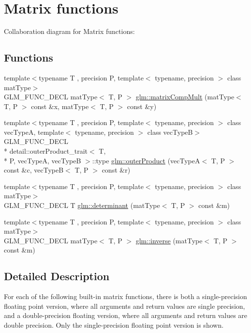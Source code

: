 \hypertarget{group__core__func__matrix}{\section{Matrix functions}
\label{group__core__func__matrix}
}
Collaboration diagram for Matrix functions\-:
\subsection*{Functions}
\begin{DoxyCompactItemize}
\item 
{\footnotesize template$<$typename T , precision P, template$<$ typename, precision $>$ class mat\-Type$>$ }\\G\-L\-M\-\_\-\-F\-U\-N\-C\-\_\-\-D\-E\-C\-L mat\-Type$<$ T, P $>$ \hyperlink{group__core__func__matrix_ga4a54992e4741188ee624b21e3ba91814}{glm\-::matrix\-Comp\-Mult} (mat\-Type$<$ T, P $>$ const \&x, mat\-Type$<$ T, P $>$ const \&y)
\item 
{\footnotesize template$<$typename T , precision P, template$<$ typename, precision $>$ class vec\-Type\-A, template$<$ typename, precision $>$ class vec\-Type\-B$>$ }\\G\-L\-M\-\_\-\-F\-U\-N\-C\-\_\-\-D\-E\-C\-L \\*
detail\-::outer\-Product\-\_\-trait$<$ T, \\*
P, vec\-Type\-A, vec\-Type\-B $>$\-::type \hyperlink{group__core__func__matrix_gae9f513dc8e4f3ceb993669321b6d0f09}{glm\-::outer\-Product} (vec\-Type\-A$<$ T, P $>$ const \&c, vec\-Type\-B$<$ T, P $>$ const \&r)
\item 
{\footnotesize template$<$typename T , precision P, template$<$ typename, precision $>$ class mat\-Type$>$ }\\G\-L\-M\-\_\-\-F\-U\-N\-C\-\_\-\-D\-E\-C\-L T \hyperlink{group__core__func__matrix_ga26ea77c574802bc6fc193c40478718d2}{glm\-::determinant} (mat\-Type$<$ T, P $>$ const \&m)
\item 
{\footnotesize template$<$typename T , precision P, template$<$ typename, precision $>$ class mat\-Type$>$ }\\G\-L\-M\-\_\-\-F\-U\-N\-C\-\_\-\-D\-E\-C\-L mat\-Type$<$ T, P $>$ \hyperlink{group__core__func__matrix_ga7635d3dbe5aa10ff73a0e6903bf6bea5}{glm\-::inverse} (mat\-Type$<$ T, P $>$ const \&m)
\end{DoxyCompactItemize}


\subsection{Detailed Description}
For each of the following built-\/in matrix functions, there is both a single-\/precision floating point version, where all arguments and return values are single precision, and a double-\/precision floating version, where all arguments and return values are double precision. Only the single-\/precision floating point version is shown. 

